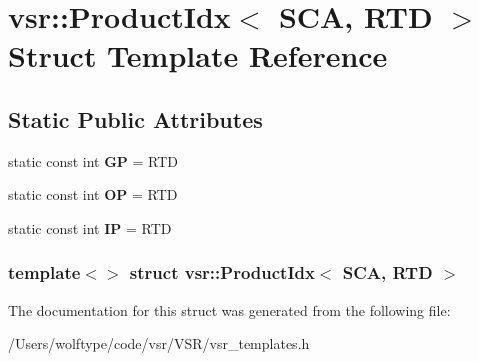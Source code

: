 \hypertarget{structvsr_1_1_product_idx_3_01_s_c_a_00_01_r_t_d_01_4}{\section{vsr\-:\-:Product\-Idx$<$ S\-C\-A, R\-T\-D $>$ Struct Template Reference}
\label{structvsr_1_1_product_idx_3_01_s_c_a_00_01_r_t_d_01_4}
}
\subsection*{Static Public Attributes}
\begin{DoxyCompactItemize}
\item 
\hypertarget{structvsr_1_1_product_idx_3_01_s_c_a_00_01_r_t_d_01_4_a31620bcfac1bcf134f345e1b188b0bdc}{static const int {\bfseries G\-P} = R\-T\-D}\label{structvsr_1_1_product_idx_3_01_s_c_a_00_01_r_t_d_01_4_a31620bcfac1bcf134f345e1b188b0bdc}

\item 
\hypertarget{structvsr_1_1_product_idx_3_01_s_c_a_00_01_r_t_d_01_4_aaaac4adf94a72ffbb2cd03a2f31d64ab}{static const int {\bfseries O\-P} = R\-T\-D}\label{structvsr_1_1_product_idx_3_01_s_c_a_00_01_r_t_d_01_4_aaaac4adf94a72ffbb2cd03a2f31d64ab}

\item 
\hypertarget{structvsr_1_1_product_idx_3_01_s_c_a_00_01_r_t_d_01_4_abd7d9e054f2ae24df570e15b75e871f9}{static const int {\bfseries I\-P} = R\-T\-D}\label{structvsr_1_1_product_idx_3_01_s_c_a_00_01_r_t_d_01_4_abd7d9e054f2ae24df570e15b75e871f9}

\end{DoxyCompactItemize}
\subsubsection*{template$<$$>$ struct vsr\-::\-Product\-Idx$<$ S\-C\-A, R\-T\-D $>$}



The documentation for this struct was generated from the following file\-:\begin{DoxyCompactItemize}
\item 
/\-Users/wolftype/code/vsr/\-V\-S\-R/vsr\-\_\-templates.\-h\end{DoxyCompactItemize}
